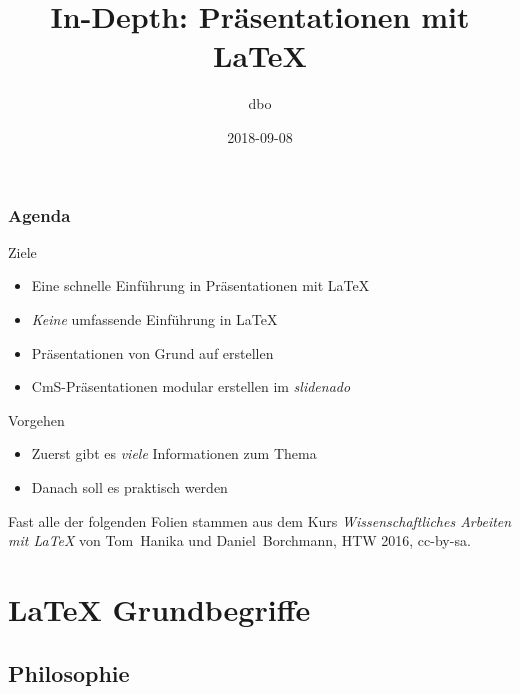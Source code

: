 \documentclass{cms-kurs}
\begin{document}
\title{In-Depth: Präsentationen mit \LaTeX{}}
\author{dbo}
\date{2018-09-08}

\maketitle{}

\begin{frame}
  \frametitle{Agenda}

  \onslide<+->

  \vfill

  \begin{block}{Ziele}
    \begin{itemize}
    \item Eine schnelle Einführung in Präsentationen mit \LaTeX{}
    \item \emph{Keine} umfassende Einführung in \LaTeX{}
    \item Präsentationen von Grund auf erstellen
    \item CmS-Präsentationen modular erstellen im \emph{slidenado}
    \end{itemize}
  \end{block}

  \vfill

  \onslide<+->

  \begin{block}{Vorgehen}
    \begin{itemize}
    \item Zuerst gibt es \emph{viele} Informationen zum Thema
    \item Danach soll es praktisch werden
    \end{itemize}
  \end{block}

  \bigskip{}

  \onslide<+->

  Fast alle der folgenden Folien stammen aus dem Kurs \emph{Wissenschaftliches
    Arbeiten mit \LaTeX} von Tom~Hanika und Daniel~Borchmann, HTW 2016,
  cc-by-sa.

\end{frame}

\section{\LaTeX{} Grundbegriffe}

\subsection{Philosophie}
\end{document}
